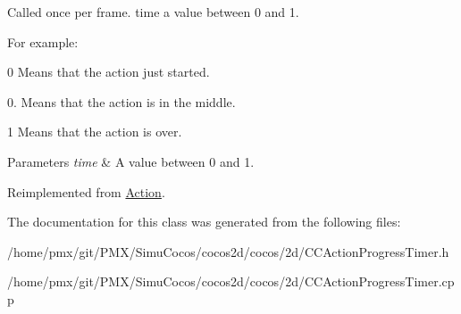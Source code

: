 Called once per frame. time a value between 0 and 1.

For example\+:
\begin{DoxyItemize}
\item 0 Means that the action just started.
\item 0. Means that the action is in the middle.
\item 1 Means that the action is over.
\end{DoxyItemize}


\begin{DoxyParams}{Parameters}
{\em time} & A value between 0 and 1. \\
\hline
\end{DoxyParams}


Reimplemented from \hyperlink{classAction_a937e646e63915e33ad05ba149bfcf239}{Action}.



The documentation for this class was generated from the following files\+:\begin{DoxyCompactItemize}
\item 
/home/pmx/git/\+P\+M\+X/\+Simu\+Cocos/cocos2d/cocos/2d/C\+C\+Action\+Progress\+Timer.\+h\item 
/home/pmx/git/\+P\+M\+X/\+Simu\+Cocos/cocos2d/cocos/2d/C\+C\+Action\+Progress\+Timer.\+cpp\end{DoxyCompactItemize}
